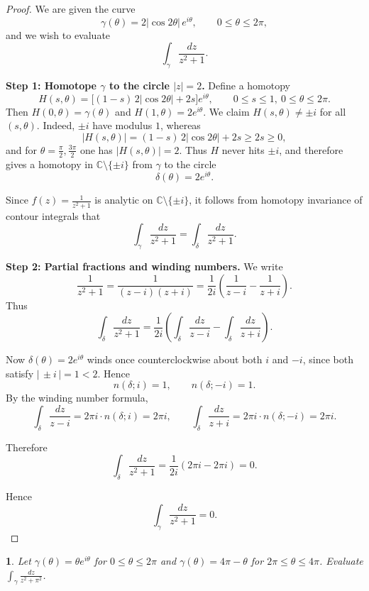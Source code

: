 \documentclass[12pt, a4paper]{report}
\theoremstyle{spaced}
\newtheorem{exercise}{}
\newcommand{\setexercise}[1]{\setcounter{exercise}{#1-1}}
\begin{document}
\begin{proof}
	We are given the curve
	\[
		\gamma(\theta)=2|\cos 2\theta|\,e^{i\theta}, \qquad 0\le \theta\le 2\pi,
	\]
	and we wish to evaluate
	\[
		\int_\gamma \frac{dz}{z^{2}+1}.
	\]

	\textbf{Step 1: Homotope $\gamma$ to the circle $|z|=2$.}
	Define a homotopy
	\[
		H(s,\theta)
		=\big[(1-s)\,2|\cos 2\theta|+2s\big]e^{i\theta},
		\qquad 0\le s\le 1,\ 0\le\theta\le 2\pi.
	\]
	Then $H(0,\theta)=\gamma(\theta)$ and $H(1,\theta)=2e^{i\theta}$.
	We claim $H(s,\theta)\neq \pm i$ for all $(s,\theta)$.
	Indeed, $\pm i$ have modulus $1$, whereas
	\[
		|H(s,\theta)|=(1-s)\,2|\cos 2\theta|+2s\ge 2s\ge 0,
	\]
	and for $\theta=\frac{\pi}{2},\frac{3\pi}{2}$ one has $|H(s,\theta)|=2$.
	Thus $H$ never hits $\pm i$, and therefore gives a homotopy in
	$\mathbb{C}\setminus\{\pm i\}$ from $\gamma$ to the circle
	\[
		\delta(\theta)=2e^{i\theta}.
	\]

	Since $f(z)=\frac{1}{z^{2}+1}$ is analytic on $\mathbb{C}\setminus\{\pm i\}$,
	it follows from homotopy invariance of contour integrals that
	\[
		\int_\gamma \frac{dz}{z^{2}+1}
		=\int_\delta \frac{dz}{z^{2}+1}.
	\]

	\textbf{Step 2: Partial fractions and winding numbers.}
	We write
	\[
		\frac{1}{z^{2}+1}
		=\frac{1}{(z-i)(z+i)}
		=\frac{1}{2i}\left(\frac{1}{z-i}-\frac{1}{z+i}\right).
	\]
	Thus
	\[
		\int_\delta \frac{dz}{z^{2}+1}
		=\frac{1}{2i}
		\left(
		\int_\delta \frac{dz}{z-i}
		-
		\int_\delta \frac{dz}{z+i}
		\right).
	\]

	Now $\delta(\theta)=2e^{i\theta}$ winds once counterclockwise about both
	$i$ and $-i$, since both satisfy $|\,\pm i\,|=1<2$.  Hence
	\[
		n(\delta;i)=1, \qquad n(\delta;-i)=1.
	\]
	By the winding number formula,
	\[
		\int_\delta \frac{dz}{z-i}=2\pi i\cdot n(\delta;i)=2\pi i,
		\qquad
		\int_\delta \frac{dz}{z+i}=2\pi i\cdot n(\delta;-i)=2\pi i.
	\]

	Therefore
	\[
		\int_\delta \frac{dz}{z^{2}+1}
		=\frac{1}{2i}(2\pi i-2\pi i)=0.
	\]

	Hence
	\[
		\int_\gamma \frac{dz}{z^{2}+1}=0.
	\]
\end{proof}


\setexercise{6}
\begin{exercise}
	Let $\gamma(\theta) = \theta e^{i\theta}$ for $0 \le \theta \le 2\pi$ and $\gamma(\theta)= 4\pi - \theta$ for $2\pi \le \theta \le 4\pi$.
	Evaluate $\displaystyle \int_{\gamma} \frac{dz}{z^{2} + \pi^{2}}$.
\end{exercise}
\end{document}
